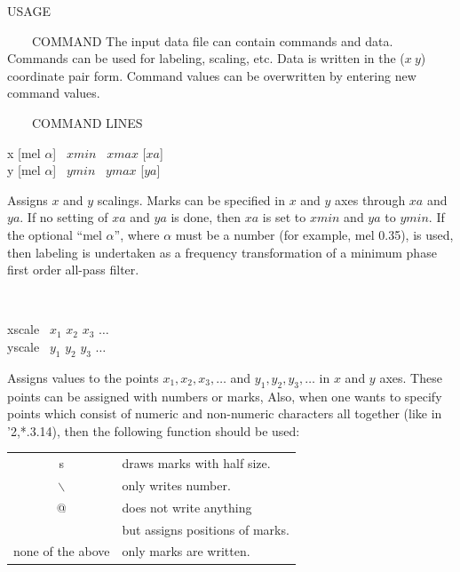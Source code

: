 \vspace{-1cm}
\begin{qsection}{USAGE}
~\vspace{-1cm}
\end{qsection}

\begin{qsection}{\ ~~~COMMAND}
The input data file can contain commands and data.
Commands can be used for labeling, scaling, etc.
Data is written in the ($x ~y$) coordinate pair form.
Command values can be overwritten by entering new command values.
\end{qsection}

\vspace{-1cm}
\begin{qsection}{\ ~~~COMMAND LINES}
\begin{minipage}[t]{5.5cm}
x [mel $\alpha$]~ $xmin$ ~$xmax$ [$xa$]\\
y [mel $\alpha$]~ $ymin$ ~$ymax$ [$ya$]\\
\end{minipage}
\begin{minipage}[t]{9cm}
Assigns $x$ and $y$ scalings.
Marks can be specified in $x$ and $y$ axes through $xa$ and $ya$.
If no setting of $xa$ and $ya$ is done,
then $xa$ is set to $xmin$ and $ya$ to $ymin$.
If the optional ``mel $\alpha$'', where $\alpha$ must be
a number (for example, mel 0.35), is used,
then labeling is undertaken as a frequency transformation of
a minimum phase first order all-pass filter.
\end{minipage} \\

\begin{minipage}[t]{5.5cm}
xscale ~$x_1$ $x_2$ $x_3$ $\dots$\\
yscale ~$y_1$ $y_2$ $y_3$ $\dots$
\end{minipage}
\begin{minipage}[t]{9cm}
Assigns values to the points $x_1, x_2,x_3,\dots$
and $y_1,y_2,y_3,\dots$ in $x$ and $y$ axes.
These points can be assigned with numbers or marks,
Also, when one wants to specify points which consist of numeric and non-numeric
characters all together (like in '2,*.3.14), then the following function should
be used:
\begin{tabular}{cl}
s & draws marks with half size.\\
$\backslash$& only writes number.\\
@ & does not write anything \\
  & but assigns positions of marks.\\
none of the above & only marks are written.
\end{tabular}\\


\end{minipage}
\end{qsection}
